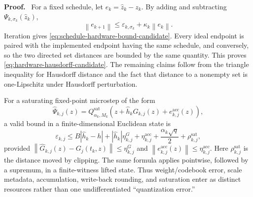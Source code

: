 \documentclass[twoside,11pt]{article}
\renewenvironment{proof}[1][Proof]{\par\noindent\textbf{#1.}\ }{\hfill\BlackBox\par\medskip}
\newcommand{\norm}[1]{\left\lVert #1\right\rVert}
\newcommand{\abs}[1]{\left\lvert #1\right\rvert}
\begin{document}
\begin{proof}
For a fixed schedule, let $e_k=\widehat z_k-z_k$.  By adding and subtracting
$\Psi_{k,\sigma_k}(\widehat z_k)$,
\[
  \norm{e_{k+1}}
  \le \varepsilon_{k,\sigma_k}+\kappa_k\norm{e_k}.
\]
Iteration gives \eqref{eq:schedule-hardware-bound-candidate}.  Every ideal
endpoint is paired with the implemented endpoint having the same schedule,
and conversely, so the two directed set distances are bounded by the same
quantity.  This proves \eqref{eq:hardware-hausdorff-candidate}.  The remaining
claims follow from the triangle inequality for Hausdorff distance and the fact
that distance to a nonempty set is one-Lipschitz under Hausdorff perturbation.
\end{proof}

\begin{remark}
For a saturating fixed-point microstep of the form
\[
  \widehat\Psi_{k,j}(z)
  =Q^{\mathrm{sat}}_{\alpha_k,M_k}
   \left(z+\widehat h_k\widehat G_{k,j}(z)
               +e^{\mathrm{acc}}_{k,j}(z)\right),
\]
a valid bound in a finite-dimensional Euclidean state is
\begin{equation}
  \varepsilon_{k,j}
  \le B\abs{\widehat h_k-h}
     +\abs{\widehat h_k}\eta^G_{k,j}
     +\eta^{\mathrm{acc}}_{k,j}
     +\frac{\alpha_k\sqrt q}{2}
     +\rho^{\mathrm{sat}}_{k,j},
  \label{eq:hardware-decomposition-candidate}
\end{equation}
provided
$\norm{\widehat G_{k,j}(z)-G_j(t_k,z)}\le\eta^G_{k,j}$ and
$\norm{e^{\mathrm{acc}}_{k,j}(z)}\le\eta^{\mathrm{acc}}_{k,j}$.
Here $\rho^{\mathrm{sat}}_{k,j}$ is the distance moved by clipping.  The same
formula applies pointwise, followed by a supremum, in a finite-witness lifted
state.  Thus weight/codebook error, scale metadata, accumulation, write-back
rounding, and saturation enter as distinct resources rather than one
undifferentiated ``quantization error.''
\end{remark}
\end{document}
